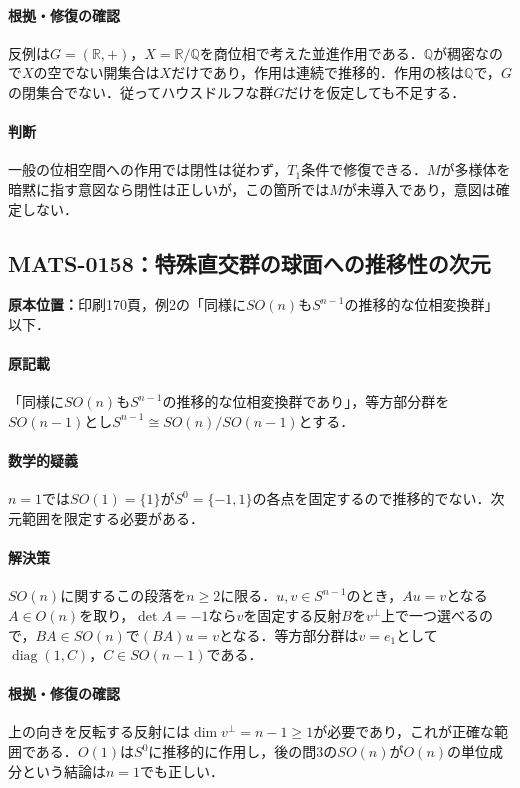 \documentclass[a4paper,10pt]{ltjsarticle}
\begin{document}
\paragraph{根拠・修復の確認}反例は$G=(\mathbb R,+)$，$X=\mathbb R/\mathbb Q$を商位相で考えた並進作用である．$\mathbb Q$が稠密なので$X$の空でない開集合は$X$だけであり，作用は連続で推移的．作用の核は$\mathbb Q$で，$G$の閉集合でない．従ってハウスドルフな群$G$だけを仮定しても不足する．

\paragraph{判断}一般の位相空間への作用では閉性は従わず，$T_1$条件で修復できる．$M$が多様体を暗黙に指す意図なら閉性は正しいが，この箇所では$M$が未導入であり，意図は確定しない．


\subsection*{MATS-0158：特殊直交群の球面への推移性の次元}\label{math:MATS-0158}
\noindent\textbf{原本位置：}印刷170頁，例2の「同様に$SO(n)$も$S^{n-1}$の推移的な位相変換群」以下．

\paragraph{原記載}「同様に$SO(n)$も$S^{n-1}$の推移的な位相変換群であり」，等方部分群を$SO(n-1)$とし$S^{n-1}\cong SO(n)/SO(n-1)$とする．

\paragraph{数学的疑義}$n=1$では$SO(1)=\{1\}$が$S^0=\{-1,1\}$の各点を固定するので推移的でない．次元範囲を限定する必要がある．

\paragraph{解決策}$SO(n)$に関するこの段落を$n\ge2$に限る．$u,v\in S^{n-1}$のとき，$Au=v$となる$A\in O(n)$を取り，$\det A=-1$なら$v$を固定する反射$B$を$v^\perp$上で一つ選べるので，$BA\in SO(n)$で$(BA)u=v$となる．等方部分群は$v=e_1$として$\operatorname{diag}(1,C)$，$C\in SO(n-1)$である．

\paragraph{根拠・修復の確認}上の向きを反転する反射には$\dim v^\perp=n-1\ge1$が必要であり，これが正確な範囲である．$O(1)$は$S^0$に推移的に作用し，後の問3の$SO(n)$が$O(n)$の単位成分という結論は$n=1$でも正しい．
\end{document}
